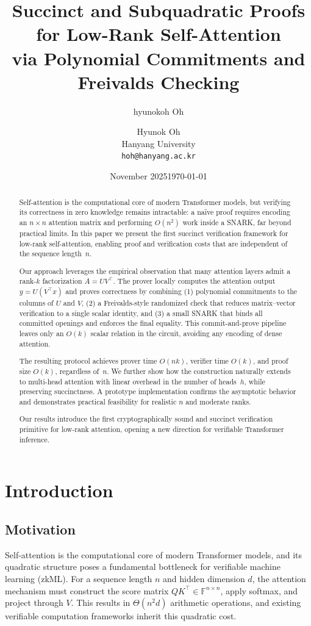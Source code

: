 \documentclass[11pt]{article}
\title{
{\Large \bf
Succinct and Subquadratic Proofs for Low-Rank Self-Attention \\
via Polynomial Commitments and Freivalds Checking}
}
\author{hyunokoh Oh}
\date{November 2025}
\author{
  Hyunok Oh \\
  Hanyang University \\
  \texttt{hoh@hanyang.ac.kr}
}
\date{\today}
\begin{document}
\maketitle

\begin{abstract}
\begin{abstract}
Self-attention is the computational core of modern Transformer models,
but verifying its correctness in zero knowledge remains intractable:
a naïve proof requires encoding an $n\times n$ attention matrix and
performing $O(n^2)$ work inside a SNARK, far beyond practical limits.
In this paper we present the first succinct verification framework for
low-rank self-attention, enabling proof and verification costs that are
independent of the sequence length~$n$.

Our approach leverages the empirical observation that many attention
layers admit a rank-$k$ factorization $A = UV^\top$.  The prover locally
computes the attention output $y = U(V^\top x)$ and proves correctness by
combining (1) polynomial commitments to the columns of $U$ and $V$,  
(2) a Freivalds-style randomized check that reduces matrix--vector
verification to a single scalar identity, and (3) a small SNARK that
binds all committed openings and enforces the final equality.
This commit-and-prove pipeline leaves only an $O(k)$ scalar relation in
the circuit, avoiding any encoding of dense attention.

The resulting protocol achieves prover time $O(nk)$, verifier time
$O(k)$, and proof size $O(k)$, regardless of~$n$.
We further show how the construction naturally extends to multi-head
attention with linear overhead in the number of heads~$h$, while
preserving succinctness.
A prototype implementation confirms the asymptotic behavior and
demonstrates practical feasibility for realistic $n$ and moderate ranks.

Our results introduce the first cryptographically sound and succinct
verification primitive for low-rank attention, opening a new direction
for verifiable Transformer inference.
\end{abstract}

\end{abstract}

\section{Introduction}

\subsection{Motivation}
Self-attention is the computational core of modern Transformer models,
and its quadratic structure poses a fundamental bottleneck for
verifiable machine learning (zkML).  
For a sequence length $n$ and hidden dimension $d$, the attention
mechanism must construct the score matrix $QK^\top \in \mathbb{F}^{n \times n}$,
apply softmax, and project through $V$.
This results in $\Theta(n^2 d)$ arithmetic operations,
and existing verifiable computation frameworks inherit this quadratic cost.
\end{document}
